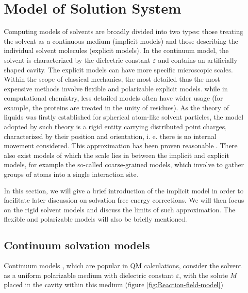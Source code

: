 
\chapter{Model of Solution System\label{chpt:models}}

Computing models of solvents are broadly divided into two types: those
treating the solvent as a continuous medium (implicit models) and
those describing the individual solvent molecules (explicit models).
In the continuum model, the solvent is characterized by the dielectric
constant $\varepsilon$ and contains an artificially-shaped cavity.
The explicit models can have more specific microscopic scales. Within
the scope of classical mechanics, the most detailed thus the most
expensive methods involve flexible and polarizable explicit models.
while in computational chemistry, less detailed models often have
wider usage (for example, the proteins are treated in the unity of
residues). As the theory of liquids was firstly established for spherical
atom-like solvent particles, the model adopted by such theory is a
rigid entity carrying distributed point charges, characterized by
their position and orientation, i. e. there is no internal movement
considered. This approximation has been proven reasonable \citep{Gray-Gubbins}.
There also exist models of which the scale lies in between the implicit
and explicit models, for example the so-called coarse-grained models,
which involve to gather groups of atoms into a single interaction
site.

In this section, we will give a brief introduction of the implicit
model in order to facilitate later discussion on solvation free energy
corrections. We will then focus on the rigid solvent models and discuss
the limits of such approximation. The flexible and polarizable models
will also be briefly mentioned. 

\section{Continuum solvation models}

Continuum models \citep{Jensen,Cramer_1999,Tomasi_1994_implicit_model},
which are popular in QM calculations, consider the solvent as a uniform
polarizable medium with dielectric constant $\varepsilon$, with the solute $M$ placed in the cavity within this medium (figure
\ref{fig:Reaction-field-model}) 

